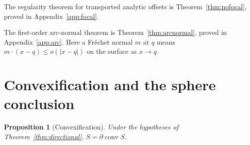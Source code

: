 \documentclass[11pt]{article}
\newtheorem{proposition}[theorem]{Proposition}
\newcommand{\conv}{\operatorname{conv}}
\begin{document}
The regularity theorem for transported analytic offsets is Theorem~\ref{thm:nofocal}, proved in Appendix~\ref{app:focal}.

The first-order arc-normal theorem is Theorem~\ref{thm:arcnormal}, proved in Appendix~\ref{app:arc}.
Here a Fr\'echet normal $m$ at $q$ means $m\cdot(x-q)\le o(|x-q|)$ on the surface as $x\to q$.

\section{Convexification and the sphere conclusion}\label{sec:global}
\begin{proposition}[Convexification]\label{prop:convexification}
Under the hypotheses of Theorem~\ref{thm:directional}, $S=\partial\conv S$.
\end{proposition}
\end{document}
